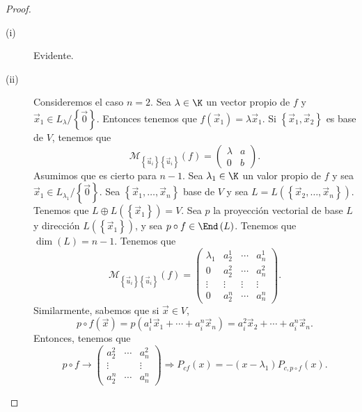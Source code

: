 \begin{proof}
\begin{description}
\item[(i)] Evidente.
\item[(ii)] Consideremos el caso $\displaystyle n = 2 $. Sea $\displaystyle \lambda \in \K $ un vector propio de $\displaystyle f $ y $\displaystyle \vec{x}_{1} \in L_{\lambda }/ \left\{ \vec{0}\right\}  $. Entonces tenemos que $\displaystyle f\left(\vec{x}_{1}\right) = \lambda\vec{x}_{1} $. Si $\displaystyle \left\{ \vec{x}_{1}, \vec{x}_{2}\right\}  $ es base de $\displaystyle V $, tenemos que
	\[\mathcal{M}_{ \left\{ \vec{u}_{i}\right\} \left\{ \vec{u}_{i}\right\} }\left(f\right) = \begin{pmatrix} \lambda & a \\
	0 & b\end{pmatrix} .\]
	Asumimos que es cierto para $\displaystyle n - 1 $. Sea $\displaystyle \lambda_{1} \in \K $ un valor propio de $\displaystyle f $ y sea $\displaystyle \vec{x}_{1} \in L_{\lambda_{1}} / \left\{ \vec{0}\right\}  $. Sea $\displaystyle \left\{ \vec{x}_{1}, \ldots, \vec{ x}_{n}\right\}  $ base de $\displaystyle V $ y sea $\displaystyle L = L\left( \left\{ \vec{x}_{2}, \ldots, \vec{x}_{n}\right\} \right) $. Tenemos que $\displaystyle L \oplus L\left( \left\{ \vec{x}_{1}\right\} \right) = V $. 
	Sea $\displaystyle p $ la proyección vectorial de base $\displaystyle L $ y dirección $\displaystyle L\left( \left\{ \vec{x}_{1}\right\} \right) $, y sea $\displaystyle p \circ f \in \End\left(L\right) $. Tenemos que $\displaystyle \dim\left(L\right) = n - 1 $. Tenemos que 
		\[\mathcal{M}_{ \left\{ \vec{u}_{i}\right\} \left\{ \vec{u}_{i}\right\} }\left(f\right) = \begin{pmatrix} \lambda _{1} & a^{1}_{2} & \cdots & a^{1}_{n} \\
		0 & a^{2}_{2} & \cdots & a^{2}_{n} \\
	\vdots & \vdots & \vdots & \vdots\\
0 & a^{n}_{2} & \cdots & a^{n}_{n}\end{pmatrix} .\]
Similarmente, sabemos que si $\displaystyle \vec{x} \in V $, 
\[p\circ f\left(\vec{x}\right) = p\left(a^{1}_{i}\vec{x}_{1} + \cdots + a^{n}_{i}\vec{x}_{n}\right)= a^{2}_{i}\vec{x}_{2} + \cdots + a^{n}_{i}\vec{x}_{n} .\]
Entonces, tenemos que 
\[p\circ f \to \begin{pmatrix} a^{2}_{2} & \cdots & a^{2}_{n} \\
\vdots & & \vdots \\
a^{n}_{2} & \cdots & a^{n}_{n}\end{pmatrix} \Rightarrow P_{cf}\left(x\right) = - \left(x - \lambda_{1}\right) P_{c,p \circ f}\left(x\right) .\]

\end{description}
\end{proof}
